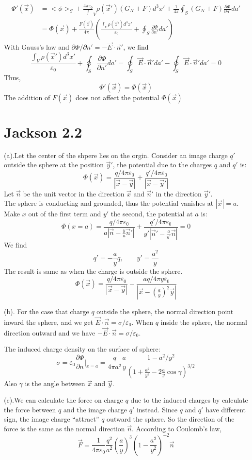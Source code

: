\documentclass{article}
\begin{document}
 \begin{align*}
   \Phi'(\vec x)&=<\phi>_S+\frac{4\pi\varepsilon_0}\int_V\rho(\vec x')(G_N+F)d^3x'+\frac{1}{4\pi}\oint_S(G_N+F)\frac{\partial \Phi}{\partial n'}da'\\
               &=\Phi(\vec x)+\frac{F(\vec x)}{4\pi}(\frac{\int_V\rho(\vec x')d^3x'}{\varepsilon_0}+\oint_S\frac{\partial \Phi}{\partial n'}da')
 \end{align*}
 With Gauss's law and $\partial \Phi/\partial n'=-\vec E\cdot\vec n'$, we find
 \[ \frac{\int_V\rho(\vec x')d^3x'}{\varepsilon_0}+\oint_S\frac{\partial \Phi}{\partial n'}da'=\oint_S\vec E\cdot\vec n'da'-\oint_S\vec E\cdot\vec n'da'=0 \]
 Thus,
  \[ \boxed{\Phi'(\vec x)=\Phi(\vec x)} \]
 The addition of $F(\vec x)$ does not affect the potential $\Phi(\vec x)$
 \pagebreak
\section*{Jackson 2.2}\par
(a).Let the center of the shpere lies on the orgin. Consider an image charge $q'$ outside the sphere at the position $\vec y'$, the potential due to the charges $q$ and $q'$ is:
\[ \Phi(\vec x)=\frac{q/4\pi\varepsilon_0}{|\vec x-\vec y|}+\frac{q'/4\pi\varepsilon_0}{|\vec x-\vec y'|} \]
Let $\vec n$ be the unit vector in the direction $\vec x$ and $\vec n'$ in the direction $\vec y'$.\\
The sphere is conducting and grounded, thus the potential vanishes at $|\vec x|=a$. Make $x$ out of the first term and $y'$ the second, the potential at $a$ is:
\[ \Phi(x=a)=\frac{q/4\pi\varepsilon_0}{a|\vec n-\frac{y}{a}\vec n'|}+\frac{q'/4\pi\varepsilon_0}{y'|\vec n'-\frac{a}{y'}\vec n|}=0 \]
We find
\[ q'=-\frac{a}{y}q,\qquad y'=\frac{a^2}{y} \]
The result is same as when the charge is outside the sphere.\\
\[ \boxed{\Phi(\vec x)=\frac{q/4\pi\varepsilon_0}{|\vec x-\vec y|}-\frac{aq/4\pi y\varepsilon_0}{|\vec x-(\frac{a}{y})^2\vec y|}} \]\par
(b). For the case that charge $q$ outside the sphere, the normal direction point inward the sphere, and we get $\vec E\cdot\vec n=\sigma/\varepsilon_0$. When $q$ inside the sphere, the normal direction outward and we have $-\vec E\cdot\vec n=\sigma/\varepsilon_0$.\par
The induced charge density on the surface of sphere:
\[
  \boxed{\sigma=\varepsilon_0\frac{\partial\Phi}{\partial n}|_{x=a}=\frac{q}{4\pi a^2}\frac{a}{y}\frac{1-a^2/y^2}{(1+\frac{a^2}{y^2}-2\frac{a}{y}\cos\gamma)^{3/2}}}
\]
Also $\gamma$ is the angle between $\vec x$ and $\vec y$.\par
(c).We can calculate the force on charge $q$ due to the induced charges by calculate the force between $q$ and the image charge $q'$ instead. Since $q$ and $q'$ have different sign, the image charge ``attract'' $q$ outward the sphere. So the direction of the force is the same as the normal direction $\vec n$. According to Coulomb's law,
\[ \boxed{\vec F=\frac{1}{4\pi\varepsilon_0}\frac{q^2}{a^2}(\frac{a}{y})^3(1-\frac{a^2}{y^2})^{-2}\vec n} \]
\pagebreak
\end{document}
